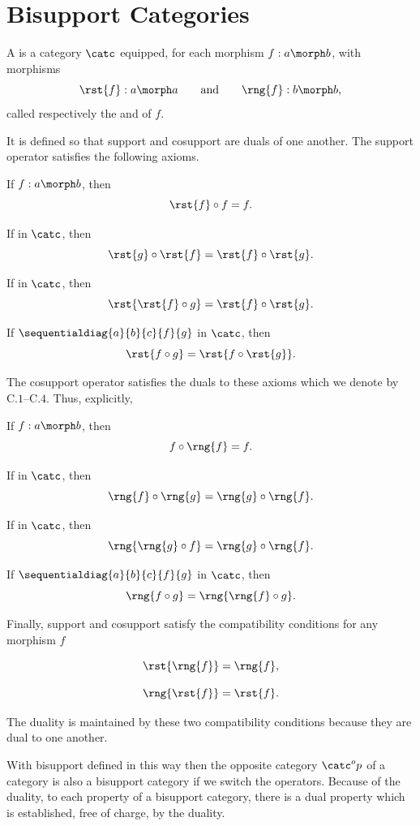 \section{Bisupport Categories}

\begin{definition}
A  is a category $\catc$ equipped, for each
morphism $f:a\morph b$, with morphisms
\[
\rst{f}:a\morph a
\qquad\text{and}\qquad
\rng{f}:b\morph b,
\]
called respectively the  and  of $f$.

It is defined so that support and cosupport are duals of one another. 
The support operator satisfies the following axioms.

\noindent [S.1]\quad
If $f : a \morph b$, then
\[
\rst{f}\circ f=f.
\]

\noindent [S.2]\quad
If \fgsourcediag in $\catc$, then
\[
\rst{g}\circ\rst{f} =\rst{f}\circ\rst{g}.
\]

\noindent [S.3]\quad
If \fgsourcediag in $\catc$, then
\[
\rst{\rst{f}\circ g} = \rst{f}\circ\rst{g}.
\]

\noindent [S.4]\quad
If $\sequentialdiag{a}{b}{c}{f}{g}$ in $\catc$, then
\[
\rst{f\circ g} = \rst{f\circ\rst{g}}.
\]

The cosupport operator satisfies the duals to these axioms which we denote by $\mathrm{C}.1$--$\mathrm{C}.4$.
Thus, explicitly,

\noindent [C.1]\quad
If $f : a \morph b$, then
\[
f\circ\rng{f} = f.
\]

\noindent [C.2]\quad
If \fgsinkdiag in $\catc$, then
\[
\rng{f}\circ\rng{g}
=
\rng{g}\circ\rng{f}.
\]

\noindent [C.3]\quad
If \fgsinkdiag in $\catc$, then
\[
\rng{\rng{g}\circ f} = \rng{g}\circ\rng{f}.
\]

\noindent [C.4]\quad
If $\sequentialdiag{a}{b}{c}{f}{g}$ in $\catc$, then
\[
\rng{f\circ g} = \rng{\rng{f}\circ g}.
\]

Finally, support and cosupport satisfy the compatibility conditions for any morphism $f$

\noindent [SC (i)]
\[
\rst{\rng{f}}=\rng{f},
\]

\noindent [SC (ii)]
\[
\rng{\rst{f}}=\rst{f}.
\]

The duality is maintained by these two compatibility conditions because they are dual to one another.
\end{definition}

With bisupport defined in this way then the opposite category $\catc^op$
of a category \catcw is also a bisupport category if we switch the operators. Because of the duality, to each property of a bisupport category, there is a dual property which is established, free of charge, by the duality. 

